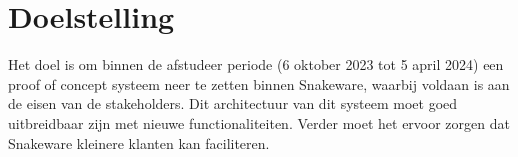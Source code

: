 \section{Doelstelling}
Het doel is om binnen de afstudeer periode (6 oktober 2023 tot 5 april 2024) een proof of concept systeem neer te zetten binnen Snakeware, waarbij voldaan is aan de eisen van de stakeholders.
Dit architectuur van dit systeem moet goed uitbreidbaar zijn met nieuwe functionaliteiten.
Verder moet het ervoor zorgen dat Snakeware kleinere klanten kan faciliteren.
